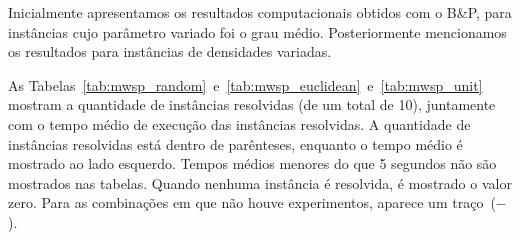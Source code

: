 \begin{table}
  \centering
{}
\caption{Instâncias resolvidas por B\&P e tempo médio de execução para distância euclidiana}\label{tab:mwsp_euclidean}
\end{table}


Inicialmente apresentamos os resultados computacionais obtidos
com o B\&P, para instâncias cujo parâmetro variado foi o
grau médio. Posteriormente mencionamos os resultados para instâncias de
densidades variadas.

As Tabelas~\ref{tab:mwsp_random}~e~\ref{tab:mwsp_euclidean}~e~\ref{tab:mwsp_unit}
mostram a quantidade de instâncias resolvidas (de um total de 10),
juntamente com o tempo médio de execução das instâncias
resolvidas. A quantidade de instâncias resolvidas está dentro de
parênteses, enquanto o tempo médio é mostrado ao lado esquerdo.  Tempos médios 
menores do que 5 segundos não são mostrados nas tabelas.  Quando
nenhuma instância é resolvida, é mostrado o valor zero. Para as
combinações em que não houve experimentos, aparece um traço~($-$).

